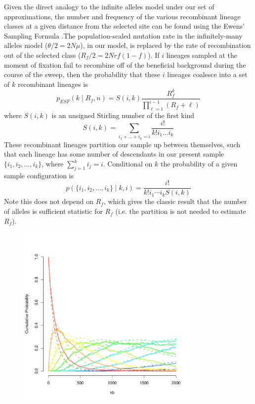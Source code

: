 \documentclass[a4paper,10pt]{article}
\begin{document}
Given the direct analogy to the infinite alleles model under our set of approximations, the number and frequency of the various recombinant lineage classes at a given distance from the selected site can be found using the Ewens' Sampling Formula \citep[ESF][]{}.The population-scaled mutation rate in the infinitely-many alleles model ($\theta/2=2N\mu$), in our model, is replaced by the rate of recombination out of the selected class ($R_{f}/2=2Nrf(1-f)$). If $i$ lineages sampled at the moment of fixation fail to recombine off of the beneficial background during the course of the sweep, then the probability that these $i$ lineages coalesce into a set of $k$ recombinant lineages is 
\begin{equation}
	p_{ESF}(k \mid R_f,n)  = S(i,k) \frac{R_f^k}{ \prod_{\ell=1}^{i-1} (R_f +\ell) }  \label{ESF1}
\end{equation}
where $S(i,k)$ is an unsigned Stirling number of the first kind
\begin{equation}
	S(i,k) = \sum_{i_1 + \dots + i_k = i} \frac{i!}{k!i_1\dots i_k}
\end{equation}
These recombinant lineages partition our sample up between themselves, such that each lineage has some number of descendants in our present sample $\{i_1,i_2,\dots,i_k\}$, where $\sum_{j=1}^k i_j =i$. Conditional on $k$ the probability of a given sample configuration is
\begin{equation}
	p(\{i_1,i_2,\dots,i_k\} \mid k,i) = \frac{i!}{k! i_1\cdots i_k S(i,k)}  \label{ESF2}
\end{equation}
Note this does not depend on $R_f$, which gives the classic result that the number of alleles is sufficient statistic for $R_f$ (i.e. the partition is not needed to estimate $R_f$).


\begin{figure}
	\includegraphics[width = 0.8\textwidth]{../Paper_Figures/Ewens_vs_Jeremy.pdf}
\end{figure}
\end{document}
